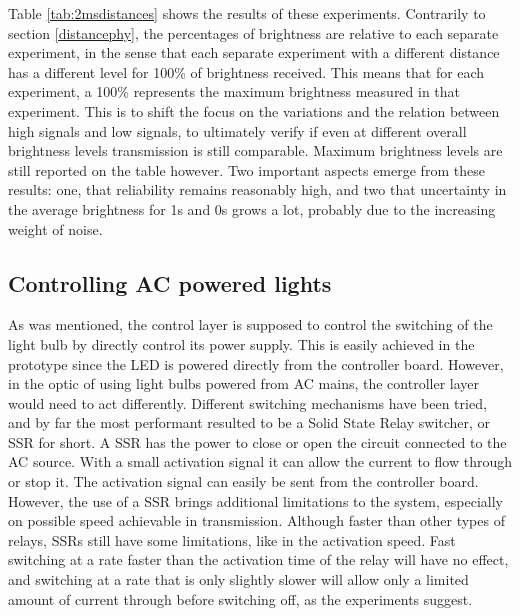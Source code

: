 Table \ref{tab:2msdistances} shows the results of these experiments.
Contrarily to section \ref{distancephy}, the percentages of brightness are relative to each separate experiment, in the sense that each separate experiment with a different distance has a different level for 100\% of brightness received.
 This means that for each experiment, a 100\% represents the maximum brightness measured in that experiment.
This is to shift the focus on the variations and the relation between high signals and low signals, to ultimately verify if even at different overall brightness levels transmission is still comparable.
Maximum brightness levels are still reported on the table however.
Two important aspects emerge from these results: one, that reliability remains reasonably high, and two that uncertainty in the average brightness for 1s and 0s grows a lot, probably due to the increasing weight of noise.

\subsection{Controlling AC powered lights}
As was mentioned, the control layer is supposed to control the switching of the light bulb by directly control its power supply.
This is easily achieved in the prototype since the LED is powered directly from the controller board.
However, in the optic of using light bulbs powered from AC mains, the controller layer would need to act differently.
Different switching mechanisms have been tried, and by far the most performant resulted to be a Solid State Relay switcher, or SSR for short.
A SSR has the power to close or open the circuit connected to the AC source. With a small activation signal it can allow the current to flow through or stop it.
The activation signal can easily be sent from the controller board.
However, the use of a SSR brings additional limitations to the system, especially on possible speed achievable in transmission.
Although faster than other types of relays, SSRs still have some limitations, like in the activation speed. 
Fast switching at a rate faster than the activation time of the relay will have no effect, and switching at a rate that is only slightly slower will allow only a limited amount of current through before switching off, as the experiments suggest. 
